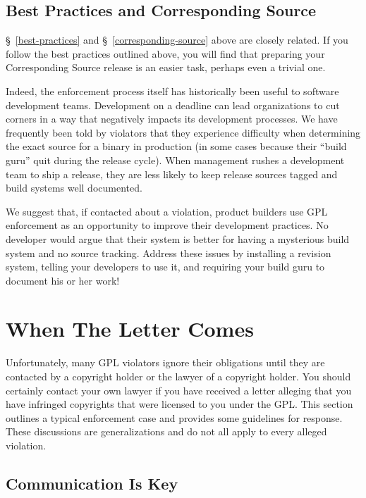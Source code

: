 \documentclass[letterpaper]{fixme}
\begin{document}
\subsection{Best Practices and Corresponding Source}

\S~\ref{best-practices} and \S~\ref{corresponding-source} above are
closely related.  If you follow the best practices outlined above, you
will find that preparing your Corresponding Source release is an easier
task, perhaps even a trivial one.

Indeed, the enforcement process itself has historically been useful to
software development teams.  Development on a deadline can lead
organizations to cut corners in a way that negatively impacts its
development processes.  We have frequently been told by violators that
they experience difficulty when determining the exact source for a binary
in production (in some cases because their ``build guru'' quit during the
release cycle).  When management rushes a development team to ship a
release, they are less likely to keep release sources tagged and build
systems well documented.

We suggest that, if contacted about a violation, product builders use GPL
enforcement as an opportunity to improve their development practices.  No
developer would argue that their system is better for having a mysterious
build system and no source tracking.  Address these issues by installing a
revision system, telling your developers to use it, and requiring your
build guru to document his or her work!

\section{When The Letter Comes}

Unfortunately, many GPL violators ignore their obligations until they are
contacted by a copyright holder or the lawyer of a copyright holder.  You
should certainly contact your own lawyer if you have received a letter
alleging that you have infringed copyrights that were licensed to you
under the GPL\@.  This section outlines a typical enforcement case and
provides some guidelines for response.  These discussions are
generalizations and do not all apply to every alleged violation.

\subsection{Communication Is Key}
\end{document}
